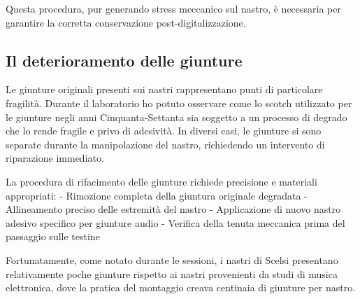 Questa procedura, pur generando stress meccanico sul nastro, è necessaria per garantire la corretta conservazione post-digitalizzazione.
\subsection{Il deterioramento delle giunture}
Le giunture originali presenti sui nastri rappresentano punti di particolare fragilità. Durante il laboratorio ho potuto osservare come lo scotch utilizzato per le giunture negli anni Cinquanta-Settanta sia soggetto a un processo di degrado che lo rende fragile e privo di adesività. In diversi casi, le giunture si sono separate durante la manipolazione del nastro, richiedendo un intervento di riparazione immediato.

La procedura di rifacimento delle giunture richiede precisione e materiali appropriati:
- Rimozione completa della giuntura originale degradata
- Allineamento preciso delle estremità del nastro
- Applicazione di nuovo nastro adesivo specifico per giunture audio
- Verifica della tenuta meccanica prima del passaggio sulle testine

Fortunatamente, come notato durante le sessioni, i nastri di Scelsi presentano relativamente poche giunture rispetto ai nastri provenienti da studi di musica elettronica, dove la pratica del montaggio creava centinaia di giunture per nastro.

